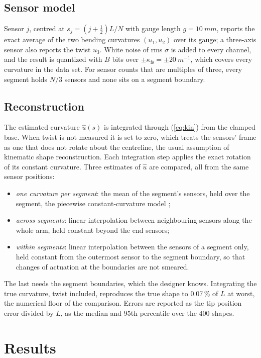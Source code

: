 \documentclass[conference]{IEEEtran}
\begin{document}
\subsection{Sensor model}

Sensor $j$, centred at $s_j = (j + \frac{1}{2})L/N$ with gauge length
$g = \SI{10}{mm}$, reports the exact average of the two bending curvatures
$(u_1, u_2)$ over its gauge; a three-axis sensor also reports the twist
$u_3$. White noise of rms $\sigma$ is added to every channel, and the result
is quantized with $B$ bits over $\pm\kappa_{\mathrm{fs}} =
\pm\SI{20}{m^{-1}}$, which covers every curvature in the data set. For
sensor counts that are multiples of three, every segment holds $N/3$
sensors and none sits on a segment boundary.

\subsection{Reconstruction}

The estimated curvature $\hat{u}(s)$ is integrated through (\ref{eq:kin})
from the clamped base. When twist is not measured it is set to zero, which
treats the sensors' frame as one that does not rotate about the centreline,
the usual assumption of kinematic shape reconstruction. Each integration
step applies the exact rotation of its constant curvature. Three estimates
of $\hat{u}$ are compared, all from the same sensor positions:
\begin{itemize}
\item \emph{one curvature per segment}: the mean of the segment's sensors,
held over the segment, the piecewise constant-curvature model
\cite{webster2010review};
\item \emph{across segments}: linear interpolation between neighbouring
sensors along the whole arm, held constant beyond the end sensors;
\item \emph{within segments}: linear interpolation between the sensors of a
segment only, held constant from the outermost sensor to the segment
boundary, so that changes of actuation at the boundaries are not smeared.
\end{itemize}
The last needs the segment boundaries, which the designer knows. Integrating
the true curvature, twist included, reproduces the true shape to 0.07\,\% of
$L$ at worst, the numerical floor of the comparison. Errors are reported as
the tip position error divided by $L$, as the median and 95th percentile
over the 400 shapes.

\section{Results}
\end{document}
